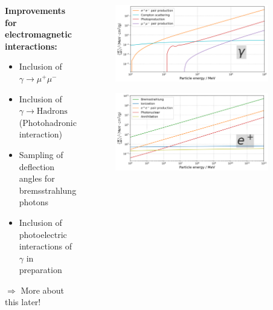 \begin{frame}

\begin{columns}[onlytextwidth]
    \begin{column}{0.45\textwidth}
    	\textbf{Improvements for electromagnetic interactions:}
    	\begin{itemize}
    		\item Inclusion of $\gamma \to \mu^+ \mu^-$
    		\item Inclusion of $\gamma \to \text{Hadrons}$ (Photohadronic interaction)
    		\item Sampling of deflection angles for bremsstrahlung photons
    		\item Inclusion of photoelectric interactions of $\gamma$ in preparation
    	\end{itemize}

    	\hspace{10pt} $\Rightarrow$ More about this later!

    \end{column}
    \begin{column}{0.55\textwidth}

    \begin{figure}
    	\centering
        \includegraphics[width=0.9\textwidth]{plots/photon_dEdx.png}
    \end{figure}
    \vspace{-3mm}
    \begin{figure}
        \centering
        \includegraphics[width=0.9\textwidth]{plots/positron_dEdx.png}
    \end{figure}

    \end{column}
\end{columns}

\end{frame}

